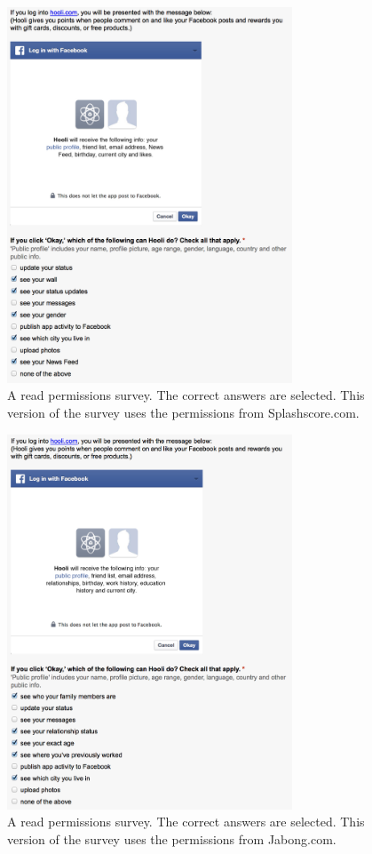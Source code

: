 \documentclass{sig-alternate}
\begin{document}
{\begin{figure}[h!]
  \centering
  \includegraphics[width=8.5cm]{62r}
  \caption{A read permissions survey. The correct answers are selected. This version of the survey uses the permissions from Splashscore.com.}
  \label{figure:62r}
\end{figure}

\begin{figure}[h!]
  \centering
  \includegraphics[width=8.5cm]{63r}
  \caption{A read permissions survey. The correct answers are selected. This version of the survey uses the permissions from Jabong.com.}
  \label{figure:63r}
\end{figure}

}
\end{document}
